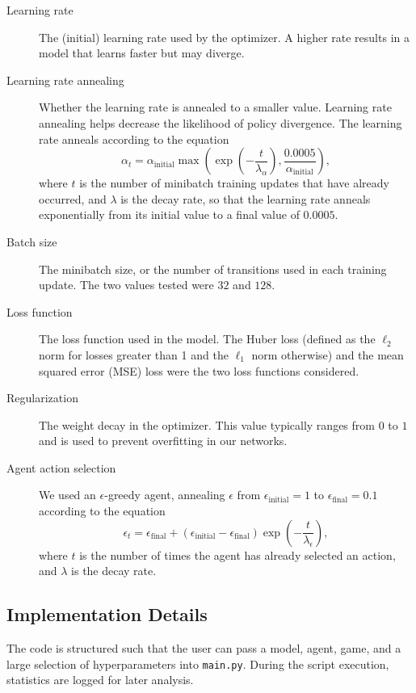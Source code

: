 \documentclass[11pt]{article}
\begin{document}
\begin{description}
    \item[Learning rate] The (initial) learning rate used by the optimizer. A higher rate results in a model that learns faster but may diverge.
    
    \item[Learning rate annealing] Whether the learning rate is annealed to a smaller value. Learning rate annealing helps decrease the likelihood of policy divergence. The learning rate anneals according to the equation $$\alpha_t = \alpha_\text{initial} \max\left(\exp\left(-\frac{t}{\lambda_\alpha}\right), \frac{0.0005}{\alpha_\text{initial}}\right),$$ where $t$ is the number of minibatch training updates that have already occurred, and $\lambda$ is the decay rate, so that the learning rate anneals exponentially from its initial value to a final value of $0.0005$.
    
    \item[Batch size] The minibatch size, or the number of transitions used in each training update. The two values tested were $32$ and $128$.
    
    \item[Loss function] The loss function used in the model. The Huber loss (defined as the $\ell_2$ norm for losses greater than 1 and the $\ell_1$ norm otherwise) and the mean squared error (MSE) loss were the two loss functions considered.
    
    \item[Regularization] The weight decay in the optimizer. This value typically ranges from $0$ to $1$ and is used to prevent overfitting in our networks.
    
    \item[Agent action selection] We used an $\epsilon$-greedy agent, annealing $\epsilon$ from $\epsilon_\text{initial} = 1$ to $\epsilon_\text{final} = 0.1$ according to the equation $$\epsilon_t = \epsilon_\text{final} + (\epsilon_\text{initial} - \epsilon_\text{final}) \exp\left(-\frac{t}{\lambda_\epsilon}\right),$$ where $t$ is the number of times the agent has already selected an action, and $\lambda$ is the decay rate. 
\end{description}


\subsection{Implementation Details}

The code is structured such that the user can pass a model, agent, game, and a large selection of hyperparameters into \texttt{main.py}. During the script execution, statistics are logged for later analysis. 
\end{document}
